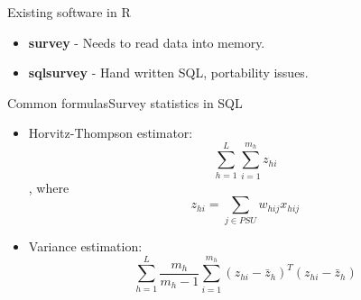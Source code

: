 \documentclass{beamer}
\begin{document}
\begin{frame}{Existing software in R}
  \begin{itemize}
  \item {
    {\bf survey} \citep{surveypackage} - 
    Needs to read data into memory.
  }
  \item {
    {\bf sqlsurvey} \citep{sqlsurveypackage} - 
    Hand written {\sf SQL}, portability issues.
  }
  \end{itemize}
\end{frame}

\begin{frame}[fragile]{Common formulas}{Survey statistics in SQL}

  \begin{itemize}
  \item {
    Horvitz-Thompson estimator:\\
        $$\sum_{h = 1}^{L} \sum_{i = 1}^{m_h} z_{hi}$$, where $$z_{hi} = \sum_{j \in PSU} w_{hij} x_{hij}$$
  }
  
  \pause
  
  \item {
    Variance estimation:\\
        $$\sum_{h = 1}^{L} \frac{m_h}{m_h - 1} 
                    \sum_{i = 1}^{m_h} (z_{hi} - \bar{z}_h)^T (z_{hi} - \bar{z}_h)$$
  }

  \end{itemize}

\end{frame}
\end{document}
